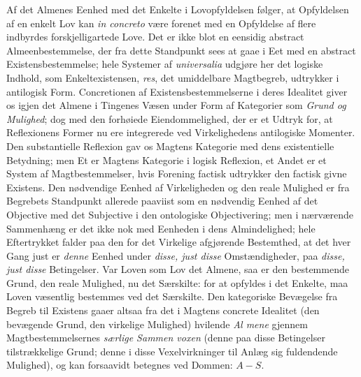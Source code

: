 \documentclass[11pt]{book}
\newcommand{\opage}[1]{\marginnote{\footnotesize\textit{[#1]}}}
\begin{document}
Af det Almenes Eenhed med det Enkelte i Lovopfyldelsen følger, at
Opfyldelsen af en enkelt Lov kan \textit{in concreto} være forenet med en
Opfyldelse af flere indbyrdes forskjelligartede Love. Det er ikke blot en
eensidig abstract Almeenbestemmelse, der fra dette Standpunkt sees at
gaae i Eet med en abstract
\opage{221} \setcounter{footnote}{0}%
Existensbestemmelse; hele Systemer af \textit{universalia} udgjøre her
det logiske Indhold, som Enkeltexistensen, \textit{res}, det umiddelbare
Magtbegreb, udtrykker i antilogisk Form. Concretionen af
Existensbestemmelserne i deres Idealitet giver os igjen det Almene i
Tingenes Væsen under Form af Kategorier som \emph{Grund og Mulighed}; dog
med den forhøiede Eiendommelighed, der er et Udtryk for, at Reflexionens
Former nu ere integrerede ved Virkelighedens antilogiske Momenter. Den
substantielle Reflexion gav os Magtens Kategorie med dens existentielle
Betydning; men Et er Magtens Kategorie i logisk Reflexion, et Andet er et
System af Magtbestemmelser, hvis Forening factisk udtrykker den factisk
givne Existens. Den nødvendige Eenhed af Virkeligheden og den reale
Mulighed er fra Begrebets Standpunkt allerede paaviist som en nødvendig
Eenhed af det Objective med det Subjective i den ontologiske
Objectivering; men i nærværende Sammenhæng er det ikke nok med Eenheden i
dens Almindelighed; hele Eftertrykket falder paa den for det Virkelige
afgjørende Bestemthed, at det hver Gang just er \emph{denne} Eenhed under
\emph{disse, just disse} Omstændigheder, paa \emph{disse, just disse}
Betingelser. Var Loven som Lov det Almene, saa er den bestemmende Grund,
den reale Mulighed, nu det Særskilte: for at opfyldes i det Enkelte, maa
Loven væsentlig bestemmes ved det Særskilte. Den kategoriske Bevægelse
fra Begreb til Existens gaaer altsaa fra det i Magtens concrete Idealitet
(den bevægende Grund, den virkelige Mulighed) hvilende \emph{Al\-%
mene} gjennem Magtbestemmelsernes \emph{særlige Sammen\-%
voxen} (denne paa disse Betingelser tilstrækkelige Grund; denne i disse
Vexelvirkninger til Anlæg sig fuldendende Mulighed), og kan forsaavidt
betegnes ved Dommen: $A - S$.
\end{document}
